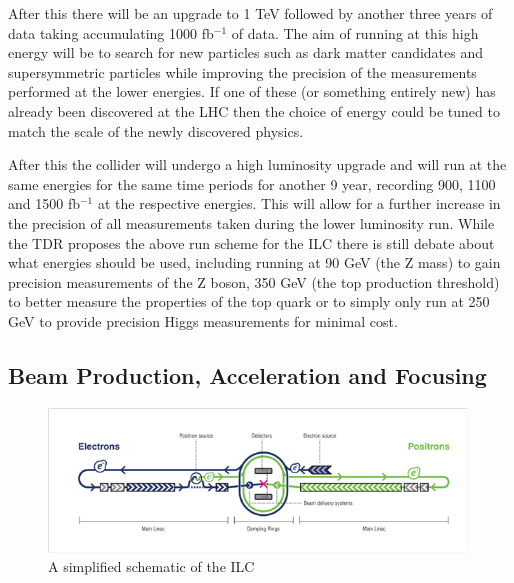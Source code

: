 After this there will be an upgrade to 1 TeV followed by another three years of data taking accumulating 1000 fb${^{-1}}$ of data. The aim of running at this high energy will be to search for new particles such as dark matter candidates and supersymmetric particles while improving the precision of the measurements performed at the lower energies. If one of these (or something entirely new) has already been discovered at the \ac{LHC} then the choice of energy could be tuned to match the scale of the newly discovered physics.

After this the collider will undergo a high luminosity upgrade and will run at the same energies for the same time periods for another 9 year, recording 900, 1100 and 1500 fb${^{-1}}$ at the respective energies. This will allow for a further increase in the precision of all measurements taken during the lower luminosity run.
While the \ac{TDR} proposes the above run scheme for the \ac{ILC} there is still debate about what energies should be used, including running at 90 GeV (the Z mass) to gain precision measurements of the Z boson, 350 GeV (the top production threshold) to better measure the properties of the top quark or to simply only run at 250 GeV to provide precision Higgs measurements for minimal cost.

\subsection{Beam Production, Acceleration and Focusing}
\label{ILC:BEAM}

\begin{figure}
  \centering
  \includegraphics[width=0.99\textwidth,keepaspectratio]{Experiments/fig/ILC_Simplified}
  \caption[Schematic of the ILC accelerator layout]{A simplified schematic of the ILC\cite{ILCTDR}}
  \label{Fig:ILCsimple}
\end{figure}

